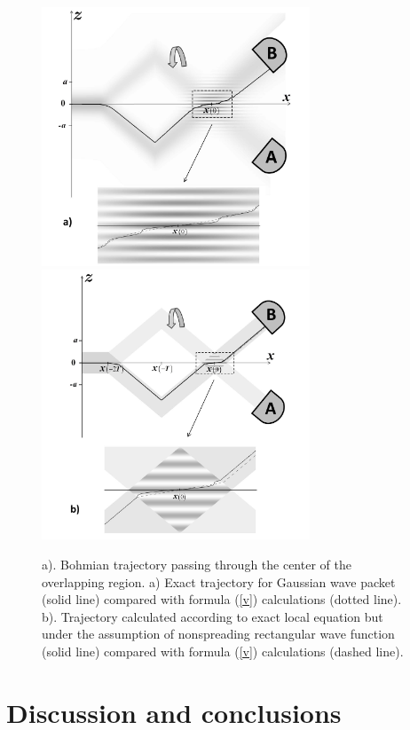 \documentclass[12pt,preprint,tightenlines]{elsarticle}
\begin{document}
\begin{figure}[H]\vspace{-10pt}
  \includegraphics[width=8cm]{11a.pdf}\\\vspace{-10pt}
  \includegraphics[width=8cm]{11b.pdf}\\\vspace{-10pt}
    \caption{a). Bohmian trajectory passing through the center of the overlapping region. a) Exact trajectory for Gaussian wave packet (solid line) compared with formula (\ref{v}) calculations (dotted line). b). Trajectory calculated according to exact local equation but under the assumption of nonspreading rectangular wave function (solid line) compared with formula (\ref{v}) calculations (dashed line).}
\end{figure}

\section{ Discussion and conclusions}
\end{document}
